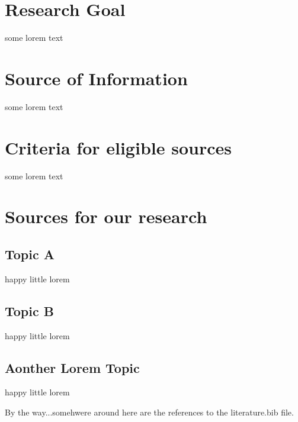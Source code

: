 \documentclass[titlepage, a4paper, 11pt]{scrartcl}
\begin{document}
\section{Research Goal}

some lorem text

\section{Source of Information}

some lorem text

\section{Criteria for eligible sources}

some lorem text

\section{Sources for our research}

\subsection{Topic A}

happy little lorem

\subsection{Topic B}

happy little lorem

\subsection{Aonther Lorem Topic}

happy little lorem

By the way...somehwere around here are the references to the literature.bib file.

 

\end{document}
